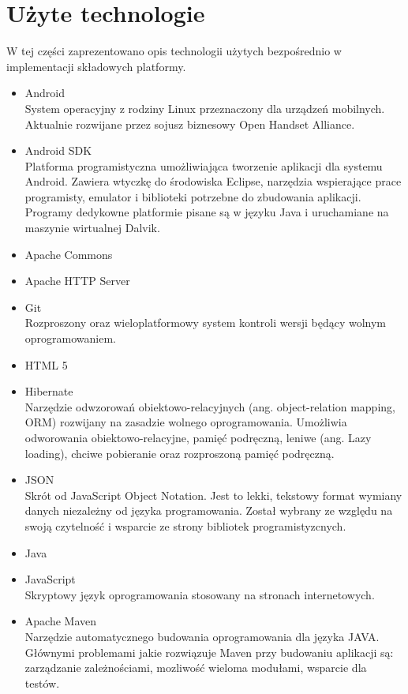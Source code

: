 \documentclass[11pt,a4paper,polish,thesis]{dcsbook}
\begin{document}
\section{Użyte technologie}
W tej części zaprezentowano opis technologii użytych bezpośrednio w implementacji składowych platformy.
\begin{itemize}
\item{Android} \\
System operacyjny z rodziny Linux przeznaczony dla urządzeń mobilnych. Aktualnie rozwijane przez sojusz biznesowy Open Handset Alliance.
\item{Android SDK} \\
Platforma programistyczna umożliwiająca tworzenie aplikacji dla systemu Android. Zawiera wtyczkę do środowiska Eclipse, narzędzia wspierające prace programisty, emulator i biblioteki potrzebne do zbudowania aplikacji. Programy dedykowne platformie pisane są w języku Java i uruchamiane na maszynie wirtualnej Dalvik.
\item{Apache Commons} \\
\item{Apache HTTP Server} \\
\item{Git} \\
Rozproszony oraz wieloplatformowy system kontroli wersji będący wolnym oprogramowaniem. 
\item{HTML 5} \\
\item{Hibernate} \\
Narzędzie odwzorowań obiektowo-relacyjnych (ang. object-relation mapping, ORM) rozwijany na zasadzie wolnego oprogramowania. Umożliwia odworowania obiektowo-relacyjne, pamięć podręczną, leniwe (ang. Lazy loading), chciwe pobieranie oraz rozproszoną pamięć podręczną.
\item{JSON} \\
Skrót od JavaScript Object Notation. Jest to lekki, tekstowy format wymiany danych niezależny od języka programowania. Został wybrany ze względu na swoją czytelność i wsparcie ze strony bibliotek programistyzcnych.
\item{Java} \\
\item{JavaScript} \\
Skryptowy język oprogramowania stosowany na stronach internetowych.
\item{Apache Maven} \\
Narzędzie automatycznego budowania oprogramowania dla języka JAVA. Głównymi problemami jakie rozwiązuje Maven przy budowaniu aplikacji są: zarządzanie zależnościami, mozliwość wieloma modułami, wsparcie dla testów.

\end{itemize}
\end{document}
